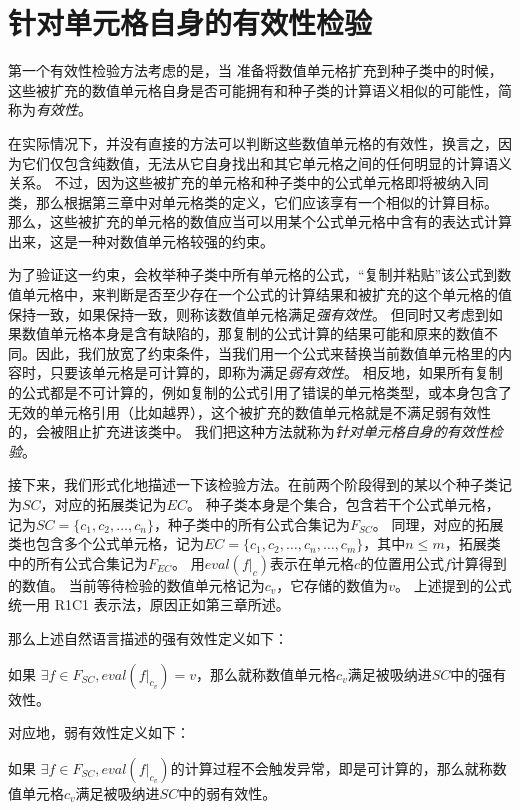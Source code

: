 \section{针对单元格自身的有效性检验}

第一个有效性检验方法考虑的是，当 \wa 准备将数值单元格扩充到种子类中的时候，这些被扩充的数值单元格自身是否可能拥有和种子类的计算语义相似的可能性，简称为\textit{有效性}。

在实际情况下，并没有直接的方法可以判断这些数值单元格的有效性，换言之，因为它们仅包含纯数值，无法从它自身找出和其它单元格之间的任何明显的计算语义关系。
不过，因为这些被扩充的单元格和种子类中的公式单元格即将被纳入同类，那么根据第三章中对单元格类的定义，它们应该享有一个相似的计算目标。
那么，这些被扩充的单元格的数值应当可以用某个公式单元格中含有的表达式计算出来，这是一种对数值单元格较强的约束。

为了验证这一约束，\wa 会枚举种子类中所有单元格的公式，“复制并粘贴”该公式到数值单元格中，来判断是否至少存在一个公式的计算结果和被扩充的这个单元格的值保持一致，如果保持一致，则称该数值单元格满足\textit{强有效性}。
但同时又考虑到如果数值单元格本身是含有缺陷的，那复制的公式计算的结果可能和原来的数值不同。因此，我们放宽了约束条件，当我们用一个公式来替换当前数值单元格里的内容时，只要该单元格是可计算的，即称为满足\textit{弱有效性}。
相反地，如果所有复制的公式都是不可计算的，例如复制的公式引用了错误的单元格类型，或本身包含了无效的单元格引用（比如越界），这个被扩充的数值单元格就是不满足弱有效性的，会被阻止扩充进该类中。
我们把这种方法就称为\textit{针对单元格自身的有效性检验}。

接下来，我们形式化地描述一下该检验方法。在前两个阶段得到的某以个种子类记为$SC$，对应的拓展类记为$EC$。
种子类本身是个集合，包含若干个公式单元格，记为$SC= \{c_{1}, c_{2}, \dots, c_{n}\}$，种子类中的所有公式合集记为$F_{SC}$。
同理，对应的拓展类也包含多个公式单元格，记为$EC=\{c_1, c_2, \dots, c_n, \dots, c_m\}$，其中$n \leq m$，拓展类中的所有公式合集记为$F_{EC}$。
用$eval(f|_c)$表示在单元格$c$的位置用公式$f$计算得到的数值。
当前等待检验的数值单元格记为$c_v$，它存储的数值为$v$。
上述提到的公式统一用 R1C1 表示法，原因正如第三章所述。

那么上述自然语言描述的强有效性定义如下：
\begin{definition}
    如果 $\exists f \in F_{SC},  eval(f|_{c_v}) = v$，那么就称数值单元格$c_v$满足被吸纳进$SC$中的强有效性。   
\end{definition}

对应地，弱有效性定义如下：
\begin{definition}
    如果 $\exists f \in F_{SC}, eval(f|_{c_v})$的计算过程不会触发异常，即是可计算的，那么就称数值单元格$c_v$满足被吸纳进$SC$中的弱有效性。
\end{definition}

